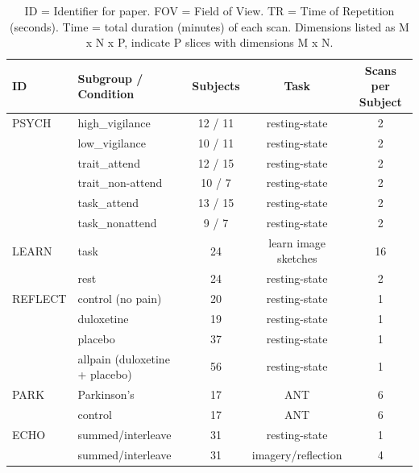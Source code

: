 \documentclass[10pt]{article}
\begin{document}
\begin{table}[h!]
\small
\centering
\begin{tabular}{ l l c c c }
\hline
\textbf{ID}  & \textbf{Subgroup / Condition}  & \textbf{Subjects}  & \textbf{Task} & \textbf{Scans per Subject} \\
\hline
PSYCH   &  high\_vigilance    & 12 / 11 & resting-state                    & 2 \\
        &  low\_vigilance     & 10 / 11 & resting-state                    & 2 \\
        &  trait\_attend      & 12 / 15 & resting-state                    & 2 \\
        &  trait\_non-attend  & 10 / 7  & resting-state                    & 2 \\
        &  task\_attend       & 13 / 15 & resting-state                    & 2 \\
        &  task\_nonattend    &  9 / 7  & resting-state                    & 2 \\
\hline
LEARN   &  task              & 24      & learn image sketches & 16 \\
        &  rest              & 24      & resting-state                    & 2 \\
\hline
REFLECT &  control (no pain) & 20      & resting-state                    & 1 \\
        &  duloxetine        & 19      & resting-state                    & 1 \\
        &  placebo           & 37      & resting-state                    & 1 \\
        &  allpain (duloxetine + placebo) & 56         & resting-state    & 1 \\
\hline
PARK    &  Parkinson's       & 17      & ANT                              & 6 \\
        &  control           & 17      & ANT                              & 6 \\
\hline
ECHO    &  summed/interleave & 31      & resting-state                    & 1 \\
        &  summed/interleave & 31      & imagery/reflection               & 4 \\
\hline
\end{tabular}
\caption{
    ID = Identifier for paper. FOV = Field of View. TR = Time of Repetition (seconds).
    Time = total duration (minutes) of each scan. Dimensions listed as M x N x P,
    indicate P slices with dimensions M x N.
}
\label{table:2}
\end{table}
\end{document}
